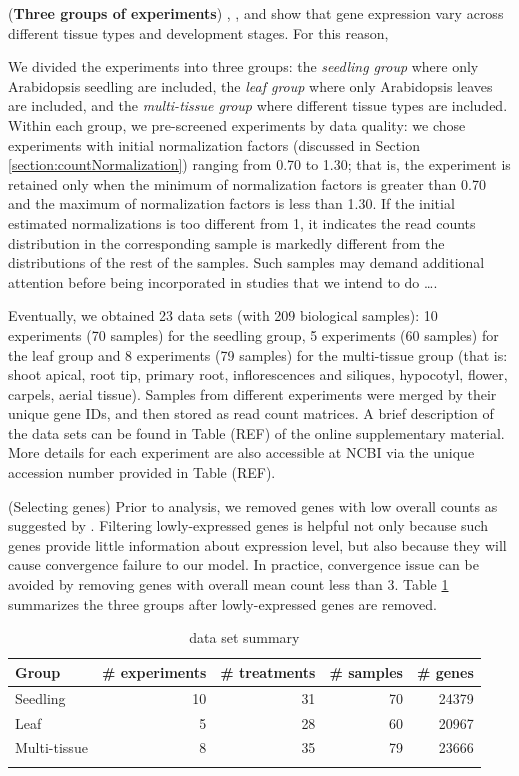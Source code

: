 \documentclass[11pt, a4paper]{article}
\begin{document}
(\textbf{Three groups of experiments}) \cite{czechowski2005genome}, \cite{hruz2011refgenes}, and
\cite{dekkers2012identification} show that gene expression vary across
different tissue types and development stages. For this reason, 

We divided the experiments into three groups: the \textit{seedling group}
where only Arabidopsis seedling are included, the \textit{leaf group} where
only Arabidopsis leaves are included, and the \textit{multi-tissue group}
where different tissue types are included. Within each group, we pre-screened
experiments by data quality: we chose experiments with initial normalization
factors (discussed in Section \ref{section:countNormalization}) ranging from
0.70 to 1.30; that is, the experiment is retained only when the minimum of
normalization factors is greater than 0.70 and the maximum of normalization
factors is less than 1.30. 
If the initial estimated normalizations is too different from 1, it indicates
the read counts distribution in the corresponding sample is markedly different
from the distributions of the rest of the samples. Such samples may demand
additional attention before being incorporated in studies that we intend to do
\dots.


Eventually, we obtained 23 data sets (with 209 biological samples): 10
experiments (70 samples) for the seedling group, 5 experiments (60 samples)
for the leaf group and 8 experiments (79 samples) for the multi-tissue group
(that is: shoot apical,  root tip, primary root, inflorescences and siliques,
hypocotyl, flower, carpels, aerial tissue). Samples from different experiments
were merged by their unique gene IDs, and then stored as read count matrices.
A brief description of the data sets can be found in Table (REF) of the online
supplementary material. More details for each experiment are also accessible
at NCBI via the unique accession number provided in Table (REF).


(Selecting genes) Prior to analysis, we removed genes with low overall counts
as suggested by \cite{anders2013count}. Filtering lowly-expressed genes is
helpful not only because such genes provide little information about
expression level,  but also because they will cause convergence failure to our
model. In practice, convergence issue can be avoided by removing genes with
overall mean count less than 3. Table \ref{table:TableSet3} summarizes the
three groups after lowly-expressed genes are removed.

\begin{table}[h]
    \centering
    \caption[3.2]{data set summary}
    \begin{tabular}{lrrrr} \hline
	Group & \#  experiments & \# treatments  & \# samples & \# genes \\ \hline
	Seedling &10 & 31 &70  &24379  \\
	Leaf &5 & 28 & 60 &20967  \\
	Multi-tissue &8 &35  &79  & 23666\\ \hline
	\label{table:TableSet3}
    \end{tabular}
\end{table}
\end{document}
